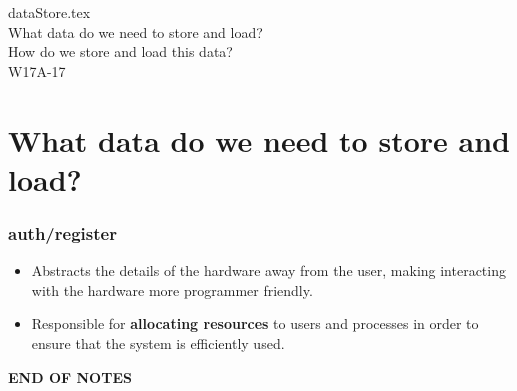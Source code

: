 \documentclass[12pt]{article}  %
\title{}
\author{Tim Fan}
\date{}
\begin{document}
\begin{center} 
dataStore.tex \\
What data do we need to store and load? \\ 
How do we store and load this data? \\
W17A-17
\end{center}

\section*{What data do we need to store and load?}

\subsubsection*{auth/register}
\begin{itemize}
\item Abstracts the details of the hardware away from the user, making interacting with the hardware more programmer friendly.
\item Responsible for \textbf{allocating resources} to users and processes in order to ensure that the system is efficiently used.
\end{itemize}

\bigskip
\bigskip
\centering
\textbf{END OF NOTES}
\end{document}
